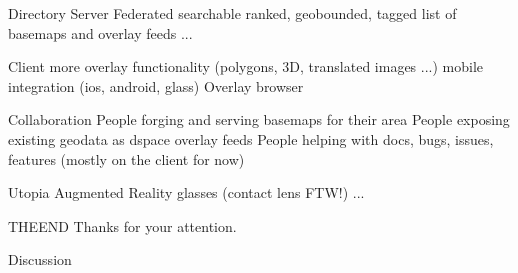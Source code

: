 \documentclass{beamer}
\begin{document}
\begin{frame}{Directory Server}
 Federated searchable ranked, geobounded, tagged list of basemaps and overlay feeds
 ...
\end{frame}

\begin{frame}{Client}
 more overlay functionality (polygons, 3D, translated images ...)
 mobile integration (ios, android, glass)
 Overlay browser
\end{frame}

\begin{frame}{Collaboration}
 People forging and serving basemaps for their area
 People exposing existing geodata as dspace overlay feeds
 People helping with docs, bugs, issues, features (mostly on the client for now)
\end{frame}

\begin{frame}{Utopia}
 Augmented Reality glasses (contact lens FTW!)
 ...
\end{frame}

\begin{frame}{THEEND}
 Thanks for your attention.

 Discussion
\end{frame}
\end{document}
